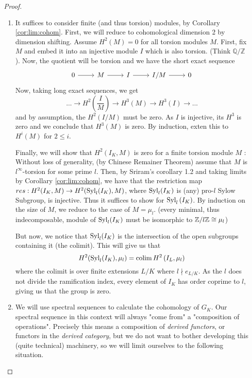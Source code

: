 \begin{proof}
\begin{enumerate}[(1)]
		\item 
			It suffices to consider
			finite (and thus torsion) modules, by Corollary \ref{cor:lim:cohom}.
			First, we will reduce to cohomological dimension 2 by dimension
			shifting. 
			Assume \(H^{2}(M) = 0\) for all torsion modules \(M\).
			First, fix \(M\) and embed it into an injective module \(I\) 
			which is also torsion.
			(Think \(\mathbb{Q} / \mathbb{Z}\)).
			Now, the quotient will be torsion and we have the short exact sequence
			\[
			\begin{tikzcd}
			0 \arrow{r}{} & M \arrow{r}{} & 
			I \arrow{r}{} & I / M \arrow{r}{} & 0
			\end{tikzcd}
			\]
			Now, taking long exact sequences, we get
			\[
				\ldots \to H^{2}(\frac{I}{M}) \to 
				H^{3}(M) \to H^{3}(I) \to \ldots
			\] 
			and by assumption, the \(H^{2}(I / M)\) must be zero.
			As \(I\) is injective, its \(H^{3}\) is zero and we conclude
			that \(H^{3}(M)\) is zero. 
			By induction, exten this to \(H^{i}(M)\) for \(2 \leq i\).

			Finally, we will show that \(H^{2}(I_{K},M)\) is zero 
			for a finite torsion module \(M\) :
			Without loss of generality, (by Chinese Remainer Theorem)
			assume that \(M\) is \(l^{\infty}\)-torsion for some prime 
			\(l\).
			Then, by Sriram's corollary 1.2 and taking limits by
			Corollary \ref{cor:lim:cohom}, we have that the restriction
			map \(res : H^{2}(I_{K},M) \to H^{2}(\operatorname{Syl}_{l}(I_{K}),M)\),
			where \(\operatorname{Syl}_{l}(I_{K})\) is (any) pro-\(l\) Sylow Subgroup,
			is injective. 
			Thus it suffices to show for \(\operatorname{Syl}_{l}\left( I_{K} \right)\).
			By induction on the size of \(M\), we reduce to the case of
			\(M = \mu_{l}\).
			(every minimal, thus indecomposable, module of 
			\(\operatorname{Syl}_{l}(I_{K})\) must be isomorphic to
			\(\mathbb{Z} / l\mathbb{Z} \cong \mu_{l}\))

			But now, we notice that \(\operatorname{Syl}_{l}(I_{K})\) is the intersection
			of the open subgroups containing it (the colimit). 
			This will give us that
			\[
				H^{2}(\operatorname{Syl}_{l}(I_{K}),\mu_{l}) = 
				\operatorname{colim} H^{2}\left( I_{L},\mu_{l} \right)
			\] 
			where the colimit is over finite extensions \(L / K\) where
			\(l \nmid e_{L / K}\).
			As the \(l\) does not divide the ramification index, every
			element of \(I_{K}\) has order coprime to \(l\), giving us that 
			the group is zero.

		\item
			We will use spectral sequences to calculate the cohomology
			of \(G_{K}\). 
			Our spectral sequence in this context will always "come from"
			a "composition of operations".
			Precisely this means a composition of \textit{derived functors},
			or functors in the \textit{derived category}, but we do
			not want to bother developing this (quite technical)
			machinery, so we will limit ourselves to the following situation.


\end{enumerate}
\end{proof}
